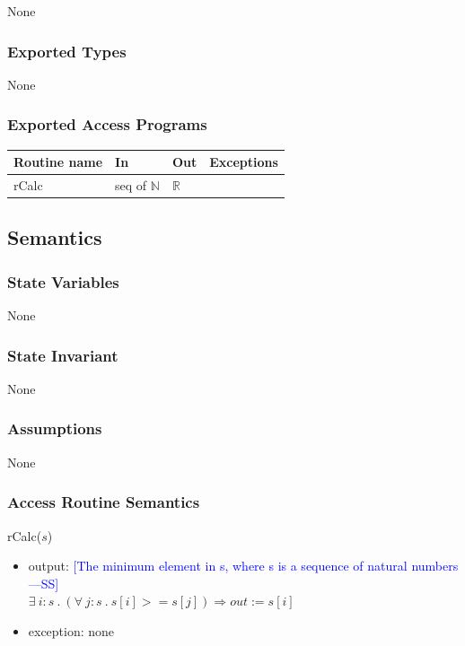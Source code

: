 \documentclass[12pt,fleqn]{examtst}
\newcommand{\authornote}[3]{\textcolor{#1}{[#3 ---#2]}}
\newcommand{\authornote}[3]{}
\newcommand{\wss}[1]{\authornote{blue}{SS}{#1}}
\begin{document}
None

\subsubsection* {Exported Types}

None

\subsubsection* {Exported Access Programs}

\begin{tabular}{| l | l | l | p{5cm} |}
\hline
\textbf{Routine name} & \textbf{In} & \textbf{Out} & \textbf{Exceptions}\\
\hline
rCalc & seq of $\mathbb{N}$ & $\mathbb{R}$ & ~\\
\hline
\end{tabular}

\subsection* {Semantics}

\subsubsection* {State Variables}

None

\subsubsection* {State Invariant}

None

\subsubsection* {Assumptions}

None

\subsubsection* {Access Routine Semantics}

rCalc($s$)
\begin{itemize}
\item output: \wss{The minimum element in s, where s is a sequence of natural
    numbers} \\
    $\exists \ i : s \ .\ (\forall \ j : s \ .\ s[i] >= s[j]) \Rightarrow out := s[i]$
\item exception: none
\end{itemize}
\end{document}
